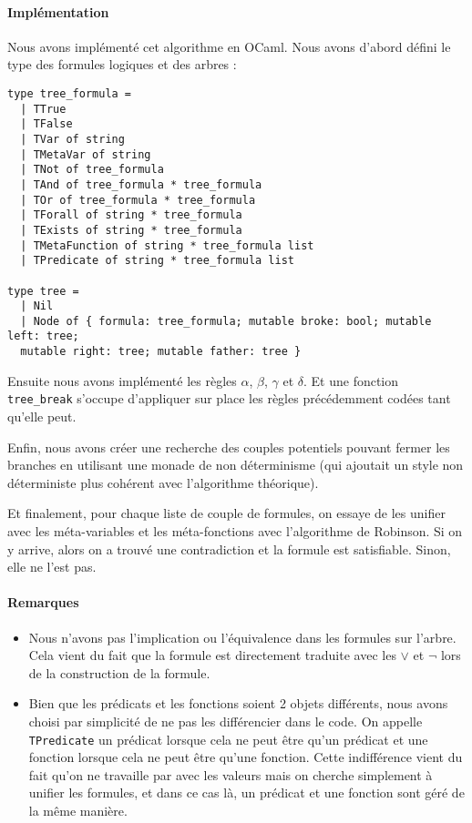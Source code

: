 \documentclass{report}
\begin{document}
\paragraph{Implémentation}
Nous avons implémenté cet algorithme en OCaml. Nous avons d'abord défini le type des formules logiques et des arbres :
\begin{verbatim}type tree_formula =
  | TTrue
  | TFalse
  | TVar of string
  | TMetaVar of string
  | TNot of tree_formula
  | TAnd of tree_formula * tree_formula
  | TOr of tree_formula * tree_formula
  | TForall of string * tree_formula
  | TExists of string * tree_formula
  | TMetaFunction of string * tree_formula list
  | TPredicate of string * tree_formula list

type tree =
  | Nil
  | Node of { formula: tree_formula; mutable broke: bool; mutable left: tree;
  mutable right: tree; mutable father: tree }
\end{verbatim}

Ensuite nous avons implémenté les règles $\alpha$, $\beta$, $\gamma$ et $\delta$. Et une fonction \verb|tree_break| s'occupe d'appliquer sur place les règles précédemment codées tant qu'elle peut.

Enfin, nous avons créer une recherche des couples potentiels pouvant fermer les branches en utilisant une monade de non déterminisme (qui ajoutait un style non déterministe plus cohérent avec l'algorithme théorique).

Et finalement, pour chaque liste de couple de formules, on essaye de les unifier avec les méta-variables et les méta-fonctions avec l'algorithme de Robinson. Si on y arrive, alors on a trouvé une contradiction et la formule est satisfiable. Sinon, elle ne l'est pas.


\paragraph{Remarques}
\begin{itemize}
  \item Nous n'avons pas l'implication ou l'équivalence dans les formules sur l'arbre. Cela vient du fait que la formule est directement traduite avec les $\lor$ et $\lnot$ lors de la construction de la formule.
  \item Bien que les prédicats et les fonctions soient 2 objets différents, nous avons choisi par simplicité de ne pas les différencier dans le code. On appelle \verb|TPredicate| un prédicat lorsque cela ne peut être qu'un prédicat et une fonction lorsque cela ne peut être qu'une fonction. Cette indifférence vient du fait qu'on ne travaille par avec les valeurs mais on cherche simplement à unifier les formules, et dans ce cas là, un prédicat et une fonction sont géré de la même manière.
\end{itemize}
\end{document}
